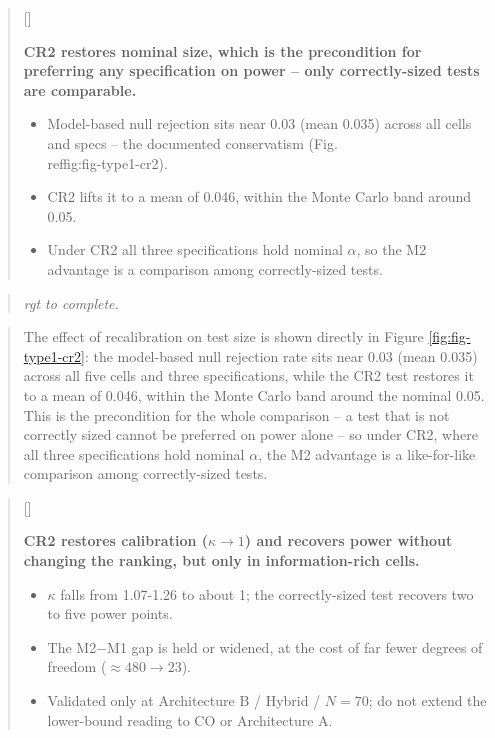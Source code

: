 \documentclass[
  11pt,
]{article}
\newcounter{pgraph}
\newenvironment{bullets}{%
  \stepcounter{pgraph}%
  \begin{quote}\small\sffamily\color[gray]{0.30}%
  {\normalfont\scriptsize\color[gray]{0.58}[\thepgraph]\enspace}}{%
  \end{quote}}
\newenvironment{rgt}{%
  \begin{quote}\small\itshape\color[RGB]{20,60,160}}{%
  \end{quote}}
\newenvironment{orig}{%
  \begin{quote}\normalsize\color[gray]{0.55}}{%
  \end{quote}}
\begin{document}
\begin{bullets}

\textbf{CR2 restores nominal size, which is the precondition for
preferring any specification on power -- only correctly-sized tests
are comparable.}

\begin{itemize}\setlength{\itemsep}{2pt}\setlength{\parskip}{0pt}
\item Model-based null rejection sits near 0.03 (mean 0.035) across
all cells and specs -- the documented conservatism
(Fig. \\ref{fig:fig-type1-cr2}).
\item CR2 lifts it to a mean of 0.046, within the Monte Carlo band
around 0.05.
\item Under CR2 all three specifications hold nominal $\alpha$, so
the M2 advantage is a comparison among correctly-sized tests.
\end{itemize}

\end{bullets}

\begin{rgt}
rgt to complete.

\end{rgt}

\begin{orig}
The effect of recalibration on test size is shown directly in
Figure \ref{fig:fig-type1-cr2}: the model-based null rejection rate
sits near 0.03 (mean 0.035) across all five cells and three
specifications, while the CR2 test restores it to a mean of 0.046,
within the Monte Carlo band around the nominal 0.05. This is the
precondition for the whole comparison -- a test that is not
correctly sized cannot be preferred on power alone -- so under CR2,
where all three specifications hold nominal \(\alpha\), the M2
advantage is a like-for-like comparison among correctly-sized tests.

\end{orig}

\begin{bullets}

\textbf{CR2 restores calibration ($\kappa \to 1$) and recovers
power without changing the ranking, but only in information-rich
cells.}

\begin{itemize}\setlength{\itemsep}{2pt}\setlength{\parskip}{0pt}
\item $\kappa$ falls from 1.07-1.26 to about 1; the correctly-sized
test recovers two to five power points.
\item The M2$-$M1 gap is held or widened, at the cost of far fewer
degrees of freedom ($\approx 480 \to 23$).
\item Validated only at Architecture B / Hybrid / $N = 70$; do not
extend the lower-bound reading to CO or Architecture A.
\end{itemize}

\end{bullets}
\end{document}
